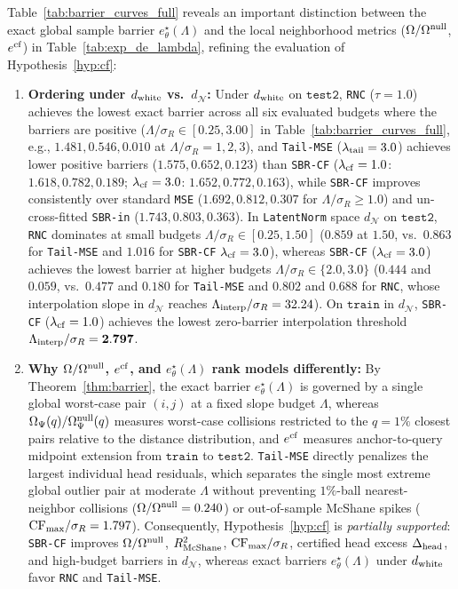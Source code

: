 \documentclass[preprint,11pt,a4paper]{elsarticle}
\newcommand{\ecf}{e^{\rm cf}}
\begin{document}
Table~\ref{tab:barrier_curves_full} reveals an important distinction between the exact global sample barrier $e^\star_\theta(\Lambda)$ and the local neighborhood metrics ($\Omega/\Omega^{\rm null}$, $\ecf$) in Table~\ref{tab:exp_de_lambda}, refining the evaluation of Hypothesis~\ref{hyp:cf}:
\begin{enumerate}
    \item \textbf{Ordering under $d_{\rm white}$ vs.\ $d_{\mathcal N}$:} Under $d_{\rm white}$ on $\texttt{test2}$, \texttt{RNC} ($\tau=1.0$) achieves the lowest exact barrier across all six evaluated budgets where the barriers are positive ($\Lambda/\sigma_R\in[0.25,3.00]$ in Table~\ref{tab:barrier_curves_full}, e.g., $1.481, 0.546, 0.010$ at $\Lambda/\sigma_R=1,2,3$), and \texttt{Tail-MSE} ($\lambda_{\rm tail}=3.0$) achieves lower positive barriers ($1.575, 0.652, 0.123$) than \texttt{SBR-CF} ($\lambda_{\rm cf}=1.0$: $1.618, 0.782, 0.189$; $\lambda_{\rm cf}=3.0$: $1.652, 0.772, 0.163$), while \texttt{SBR-CF} improves consistently over standard \texttt{MSE} ($1.692, 0.812, 0.307$ for $\Lambda/\sigma_R\ge 1.0$) and un-cross-fitted \texttt{SBR-in} ($1.743, 0.803, 0.363$). In \texttt{LatentNorm} space $d_{\mathcal N}$ on $\texttt{test2}$, \texttt{RNC} dominates at small budgets $\Lambda/\sigma_R\in[0.25,1.50]$ ($0.859$ at $1.50$, vs.\ $0.863$ for \texttt{Tail-MSE} and $1.016$ for \texttt{SBR-CF} $\lambda_{\rm cf}=3.0$), whereas \texttt{SBR-CF} ($\lambda_{\rm cf}=3.0$) achieves the lowest barrier at higher budgets $\Lambda/\sigma_R\in\{2.0,3.0\}$ ($0.444$ and $0.059$, vs.\ $0.477$ and $0.180$ for \texttt{Tail-MSE} and $0.802$ and $0.688$ for \texttt{RNC}, whose interpolation slope in $d_{\mathcal N}$ reaches $\Lambda_{\rm interp}/\sigma_R=32.24$). On $\texttt{train}$ in $d_{\mathcal N}$, \texttt{SBR-CF} ($\lambda_{\rm cf}=1.0$) achieves the lowest zero-barrier interpolation threshold $\Lambda_{\rm interp}/\sigma_R=\mathbf{2.797}$.
    \item \textbf{Why $\Omega/\Omega^{\rm null}$, $\ecf$, and $e^\star_\theta(\Lambda)$ rank models differently:} By Theorem~\ref{thm:barrier}, the exact barrier $e^\star_\theta(\Lambda)$ is governed by a single global worst-case pair $(i,j)$ at a fixed slope budget $\Lambda$, whereas $\Omega_\Psi(q)/\Omega_\Psi^{\rm null}(q)$ measures worst-case collisions restricted to the $q=1\%$ closest pairs relative to the distance distribution, and $\ecf$ measures anchor-to-query midpoint extension from $\texttt{train}$ to $\texttt{test2}$. \texttt{Tail-MSE} directly penalizes the largest individual head residuals, which separates the single most extreme global outlier pair at moderate $\Lambda$ without preventing $1\%$-ball nearest-neighbor collisions ($\Omega/\Omega^{\rm null}=0.240$) or out-of-sample McShane spikes (${\rm CF}_{\max}/\sigma_R=1.797$). Consequently, Hypothesis~\ref{hyp:cf} is \emph{partially supported}: \texttt{SBR-CF} improves $\Omega/\Omega^{\rm null}$, $R^2_{\rm McShane}$, ${\rm CF}_{\max}/\sigma_R$, certified head excess $\Delta_{\rm head}$, and high-budget barriers in $d_{\mathcal N}$, whereas exact barriers $e^\star_\theta(\Lambda)$ under $d_{\rm white}$ favor \texttt{RNC} and \texttt{Tail-MSE}.
\end{enumerate}
\end{document}
